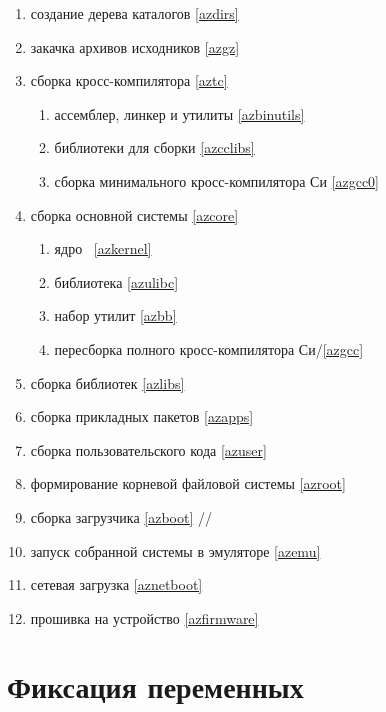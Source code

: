 \begin{enumerate}
  \item {} создание дерева каталогов \ref{azdirs} 
  \item {} закачка архивов исходников \ref{azgz} 
  \item {} сборка кросс-компилятора \ref{aztc}
  \begin{enumerate}
    \item {} ассемблер, линкер и утилиты \ref{azbinutils}
    \item {} библиотеки для сборки  \ref{azcclibs}
    \item {} сборка минимального кросс-компилятора Си \ref{azgcc0}
  \end{enumerate}
  \item {} сборка основной системы \ref{azcore}
  \begin{enumerate}
    \item {} ядро \linux\ \ref{azkernel}
    \item {} библиотека  \ref{azulibc}
    \item {} набор утилит  \ref{azbb}
    \item {} пересборка полного кросс-компилятора Си/\cpp \ref{azgcc}
  \end{enumerate}
  \item {} сборка библиотек  \ref{azlibs}
  \item {} сборка прикладных пакетов  \ref{azapps}
  \item {} сборка пользовательского кода \ref{azuser}
  \item {} формирование корневой файловой системы \ref{azroot}
  \item {} сборка загрузчика \ref{azboot}
   //
  \item {} запуск собранной системы в эмуляторе \ref{azemu}
  \item {} сетевая загрузка \ref{aznetboot}
  \item {} прошивка на устройство \ref{azfirmware}
\end{enumerate}

\section{Фиксация переменных}

